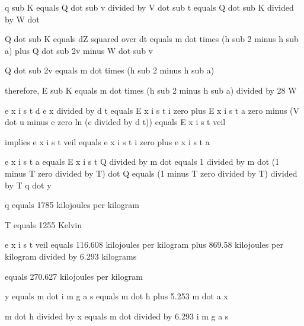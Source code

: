 q sub K equals Q dot sub v divided by V dot sub t equals Q dot sub K divided by W dot

Q dot sub K equals dZ squared over dt equals m dot times (h sub 2 minus h sub a) plus Q dot sub 2v minus W dot sub v

Q dot sub 2v equals m dot times (h sub 2 minus h sub a)

therefore, E sub K equals m dot times (h sub 2 minus h sub a) divided by 28 W

e x i s t d e x divided by d t equals E x i s t i zero plus E x i s t a zero minus (V dot u minus e zero ln (c divided by d t)) equals E x i s t veil

implies e x i s t veil equals e x i s t i zero plus e x i s t a

e x i s t a equals E x i s t Q divided by m dot equals 1 divided by m dot (1 minus T zero divided by T) dot Q equals (1 minus T zero divided by T) divided by T q dot y

q equals 1785 kilojoules per kilogram

T equals 1255 Kelvin

e x i s t veil equals 116.608 kilojoules per kilogram plus 869.58 kilojoules per kilogram divided by 6.293 kilograms

equals 270.627 kilojoules per kilogram

y equals m dot i m g a s equals m dot h plus 5.253 m dot a x

m dot h divided by x equals m dot divided by 6.293 i m g a s